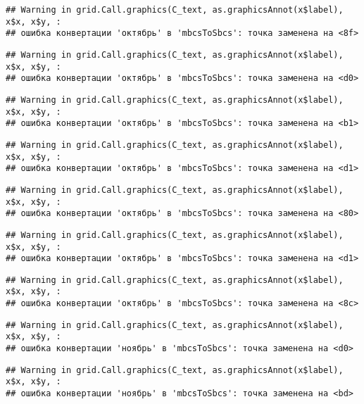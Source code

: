 \documentclass[
]{article}
\begin{document}
\begin{verbatim}
## Warning in grid.Call.graphics(C_text, as.graphicsAnnot(x$label), x$x, x$y, :
## ошибка конвертации 'октябрь' в 'mbcsToSbcs': точка заменена на <8f>
\end{verbatim}

\begin{verbatim}
## Warning in grid.Call.graphics(C_text, as.graphicsAnnot(x$label), x$x, x$y, :
## ошибка конвертации 'октябрь' в 'mbcsToSbcs': точка заменена на <d0>
\end{verbatim}

\begin{verbatim}
## Warning in grid.Call.graphics(C_text, as.graphicsAnnot(x$label), x$x, x$y, :
## ошибка конвертации 'октябрь' в 'mbcsToSbcs': точка заменена на <b1>
\end{verbatim}

\begin{verbatim}
## Warning in grid.Call.graphics(C_text, as.graphicsAnnot(x$label), x$x, x$y, :
## ошибка конвертации 'октябрь' в 'mbcsToSbcs': точка заменена на <d1>
\end{verbatim}

\begin{verbatim}
## Warning in grid.Call.graphics(C_text, as.graphicsAnnot(x$label), x$x, x$y, :
## ошибка конвертации 'октябрь' в 'mbcsToSbcs': точка заменена на <80>
\end{verbatim}

\begin{verbatim}
## Warning in grid.Call.graphics(C_text, as.graphicsAnnot(x$label), x$x, x$y, :
## ошибка конвертации 'октябрь' в 'mbcsToSbcs': точка заменена на <d1>
\end{verbatim}

\begin{verbatim}
## Warning in grid.Call.graphics(C_text, as.graphicsAnnot(x$label), x$x, x$y, :
## ошибка конвертации 'октябрь' в 'mbcsToSbcs': точка заменена на <8c>
\end{verbatim}

\begin{verbatim}
## Warning in grid.Call.graphics(C_text, as.graphicsAnnot(x$label), x$x, x$y, :
## ошибка конвертации 'ноябрь' в 'mbcsToSbcs': точка заменена на <d0>
\end{verbatim}

\begin{verbatim}
## Warning in grid.Call.graphics(C_text, as.graphicsAnnot(x$label), x$x, x$y, :
## ошибка конвертации 'ноябрь' в 'mbcsToSbcs': точка заменена на <bd>
\end{verbatim}
\end{document}
